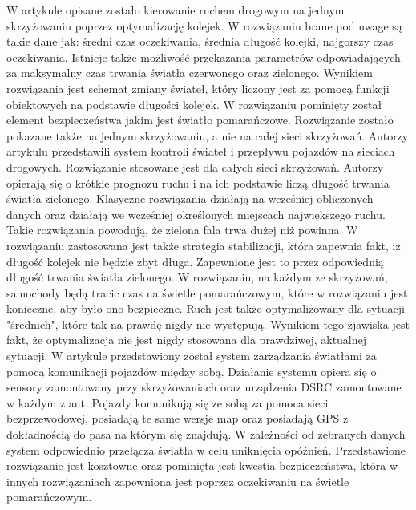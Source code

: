 \newline
\indent
W artykule \cite{de1998optimal} opisane zostało kierowanie ruchem drogowym na jednym skrzyżowaniu poprzez optymalizację kolejek. W rozwiązaniu brane pod uwage są takie dane jak: średni czas oczekiwania, średnia długość kolejki, najgorszy czas oczekiwania. Istnieje także możliwość przekazania parametrów odpowiadających za maksymalny czas trwania światła czerwonego oraz zielonego. Wynikiem rozwiązania jest schemat zmiany świateł, który liczony jest za pomocą funkcji obiektowych na podstawie długości kolejek. W rozwiązaniu pominięty został element bezpieczeństwa jakim jest światło pomarańczowe. Rozwiązanie zostało pokazane także na jednym skrzyżowaniu, a nie na całej sieci skrzyżowań.
\newline
\indent
  Autorzy artykulu \cite{lammer2008self} przedstawili system kontroli świateł i przepływu pojazdów na sieciach drogowych. Rozwiązanie stosowane jest dla całych sieci skrzyżowań. Autorzy opierają się o krótkie prognozu ruchu i na ich podstawie liczą długość trwania światła zielonego. Klasyczne rozwiązania działają na wcześniej obliczonych danych oraz działają we wcześniej określonych miejscach największego ruchu. Takie rozwiązania powodują, że zielona fala trwa dużej niż powinna. W rozwiązaniu zastosowana jest także strategia stabilizacji, która zapewnia fakt, iż długość kolejek nie będzie zbyt długa. Zapewnione jest to przez odpowiednią długość trwania światła zielonego. W rozwiązaniu, na każdym ze skrzyżowań, samochody będą tracic czas na świetle pomarańczowym, które w rozwiązaniu jest konieczne, aby było ono bezpieczne. Ruch jest także optymalizowany dla sytuacji "średnich", które tak na prawdę nigdy nie występują. Wynikiem tego zjawiska jest fakt, że optymalizacja nie jest nigdy stosowana dla prawdziwej, aktualnej sytuacji.
\newline
\indent
W artykule \cite{ferreira2010self} przedstawiony został system zarządzania światłami za pomocą komunikacji pojazdów między sobą. Działanie systemu opiera się o sensory zamontowany przy skrzyżowaniach oraz urządzenia DSRC zamontowane w każdym z aut. Pojazdy komunikują się ze sobą za pomoca sieci bezprzewodowej, posiadają te same wersje map oraz posiadają GPS z dokładnością do pasa na którym się znajdują. W zależności od zebranych danych system odpowiednio przełącza światła w celu uniknięcia opóźnień. Przedstawione rozwiązanie jest kosztowne oraz pominięta jest kwestia bezpieczeństwa, która w innych rozwiązaniach zapewniona jest poprzez oczekiwaniu na świetle pomarańczowym.
    
